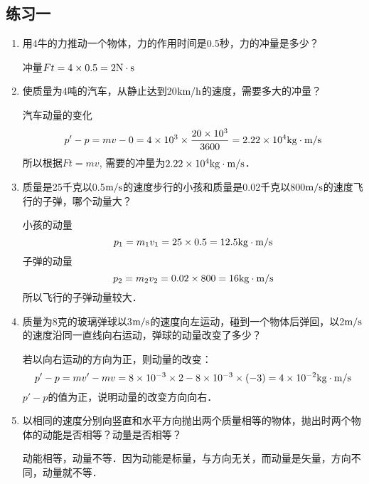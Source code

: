 \subsection{练习一}
\begin{enumerate}
    \item 用4牛的力推动一个物体，力的作用时间是0.5秒，力的冲量是多少？

    \begin{solution}
        冲量$Ft=4\times0.5=2{\rm N\cdot s}$
    \end{solution}
    \item 使质量为4吨的汽车，从静止达到20$\text{km}/\text{h}$的速度，需要多大的冲量？

    \begin{solution}
        汽车动量的变化
\[ p'-p=mv-0=4\times10^3\times\frac{20\times10^3}{3600}
        =2.22\times10^4{\rm kg\cdot m/s}\]       
        所以根据$Ft=mv$, 需要的冲量为$2.22\times10^4{\rm kg\cdot m/s}$．
    \end{solution}
    \item 质量是25千克以0.5$\text{m}/\text{s}$的速度步行的小孩和质量是0.02千克以800$\text{m}/\text{s}$的速度飞行的子弹，哪个动量大？

    \begin{solution}
小孩的动量
\[p_1=m_1v_1=25\times0.5=12.5{\rm kg\cdot m/s}\]
子弹的动量
\[p_2=m_2v_2=0.02\times800=16{\rm kg\cdot m/s}\]
所以飞行的子弹动量较大．
    \end{solution}
    \item 质量为8克的玻璃弹球以3$\text{m}/\text{s}$的速度向左运动，碰到一个物体后弹回，以2$\text{m}/\text{s}$的速度沿同一直线向右运动，弹球的动量改变了多少？

    \begin{solution}
        若以向右运动的方向为正，则动量的改变：
       \[ p'-p=mv'-mv=8\times10^{-3}\times2-8\times10^{-3}\times(-3)=4\times10^{-2}{\rm kg\cdot m/s}\]
       $ p'-p$的值为正，说明动量的改变方向向右．
    \end{solution}
    \item 以相同的速度分别向竖直和水平方向抛出两个质量相等的物体，抛出时两个物体的动能是否相等？动量是否相等？

    \begin{solution}
        动能相等，动量不等．因为动能是标量，与方向无关，而动量是矢量，方向不同，动量就不等．
    \end{solution}
\end{enumerate}


